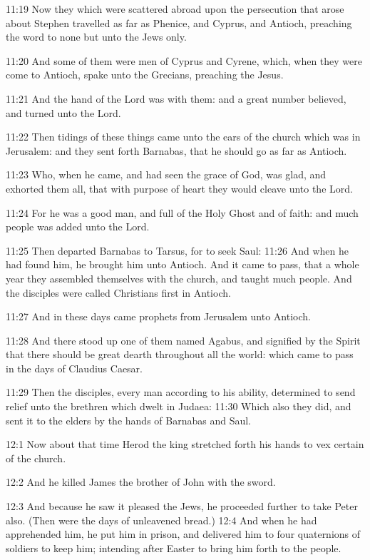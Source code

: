 11:19 Now they which were scattered abroad upon the persecution that arose about Stephen travelled as far as Phenice, and Cyprus, and Antioch, preaching the word to none but unto the Jews only.

11:20 And some of them were men of Cyprus and Cyrene, which, when they were come to Antioch, spake unto the Grecians, preaching the \LORD Jesus.

11:21 And the hand of the Lord was with them: and a great number believed, and turned unto the Lord.

11:22 Then tidings of these things came unto the ears of the church which was in Jerusalem: and they sent forth Barnabas, that he should go as far as Antioch.

11:23 Who, when he came, and had seen the grace of God, was glad, and exhorted them all, that with purpose of heart they would cleave unto the Lord.

11:24 For he was a good man, and full of the Holy Ghost and of faith: and much people was added unto the Lord.

11:25 Then departed Barnabas to Tarsus, for to seek Saul: 11:26 And when he had found him, he brought him unto Antioch. And it came to pass, that a whole year they assembled themselves with the church, and taught much people. And the disciples were called Christians first in Antioch.

11:27 And in these days came prophets from Jerusalem unto Antioch.

11:28 And there stood up one of them named Agabus, and signified by the Spirit that there should be great dearth throughout all the world: which came to pass in the days of Claudius Caesar.

11:29 Then the disciples, every man according to his ability, determined to send relief unto the brethren which dwelt in Judaea: 11:30 Which also they did, and sent it to the elders by the hands of Barnabas and Saul.

12:1 Now about that time Herod the king stretched forth his hands to vex certain of the church.

12:2 And he killed James the brother of John with the sword.

12:3 And because he saw it pleased the Jews, he proceeded further to take Peter also. (Then were the days of unleavened bread.)  12:4 And when he had apprehended him, he put him in prison, and delivered him to four quaternions of soldiers to keep him; intending after Easter to bring him forth to the people.

